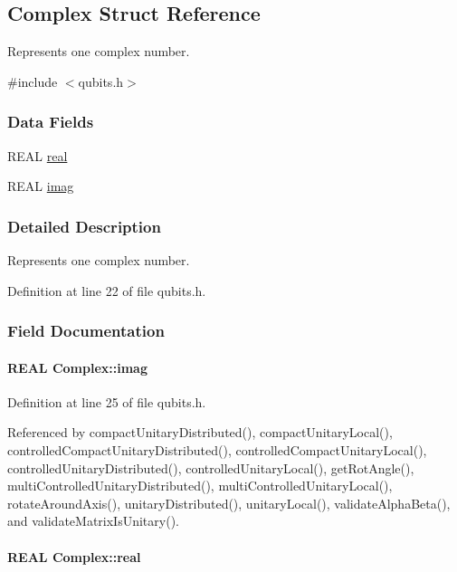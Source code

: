 \hypertarget{structComplex}{
\subsection{Complex Struct Reference}
\label{structComplex}
}


Represents one complex number.  


{\ttfamily \#include $<$qubits.h$>$}\subsubsection*{Data Fields}
\begin{DoxyCompactItemize}
\item 
REAL \hyperlink{structComplex_a479ad939835457595fcca3ca55c06283}{real}
\item 
REAL \hyperlink{structComplex_a1151948284b21c0052f203f23ab931d9}{imag}
\end{DoxyCompactItemize}


\subsubsection{Detailed Description}
Represents one complex number. 

Definition at line 22 of file qubits.h.

\subsubsection{Field Documentation}
\hypertarget{structComplex_a1151948284b21c0052f203f23ab931d9}{
\paragraph[{imag}]{\setlength{\rightskip}{0pt plus 5cm}REAL {\bf Complex::imag}}\hfill}
\label{structComplex_a1151948284b21c0052f203f23ab931d9}


Definition at line 25 of file qubits.h.

Referenced by compactUnitaryDistributed(), compactUnitaryLocal(), controlledCompactUnitaryDistributed(), controlledCompactUnitaryLocal(), controlledUnitaryDistributed(), controlledUnitaryLocal(), getRotAngle(), multiControlledUnitaryDistributed(), multiControlledUnitaryLocal(), rotateAroundAxis(), unitaryDistributed(), unitaryLocal(), validateAlphaBeta(), and validateMatrixIsUnitary().\hypertarget{structComplex_a479ad939835457595fcca3ca55c06283}{
\paragraph[{real}]{\setlength{\rightskip}{0pt plus 5cm}REAL {\bf Complex::real}}\hfill}
\label{structComplex_a479ad939835457595fcca3ca55c06283}


